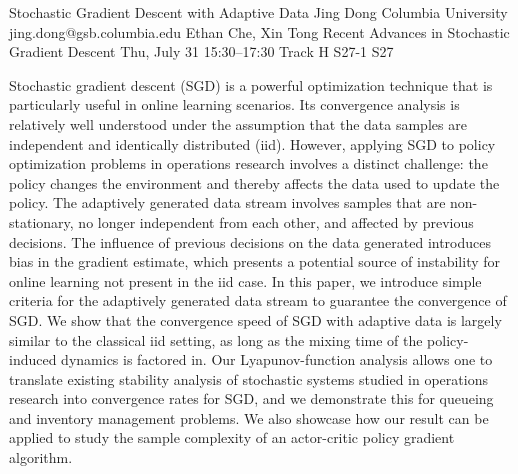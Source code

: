 \begin{talk}
  {Stochastic Gradient Descent with Adaptive Data}%
  {Jing Dong}%
  {Columbia University}%
  {jing.dong@gsb.columbia.edu}%
  {Ethan Che, Xin Tong}%
  {Recent Advances in Stochastic Gradient Descent}%
  {Thu, July 31 15:30–17:30 Track H}%
  {S27-1}%
  {S27}%
				
                
Stochastic gradient descent (SGD) is a powerful optimization technique that is particularly useful in online learning scenarios. Its convergence analysis is relatively well understood under the assumption that the data samples are independent and identically distributed (iid). However, applying SGD to policy optimization
problems in operations research involves a distinct challenge: the policy changes the environment and thereby affects the data used to update the policy. The adaptively generated data stream involves samples that are non-stationary, no longer independent from each other, and affected by previous decisions. The influence of previous decisions on the data generated introduces bias in the gradient estimate, which presents a potential source of instability for online learning not present in the iid case. In this paper, we introduce simple criteria for the adaptively generated data stream to guarantee the convergence of SGD. We show that the convergence
speed of SGD with adaptive data is largely similar to the classical iid setting, as long as the mixing time of the policy-induced dynamics is factored in. Our Lyapunov-function analysis allows one to translate existing stability analysis of stochastic systems studied in operations research into convergence rates for SGD, and
we demonstrate this for queueing and inventory management problems. We also showcase how our result can be applied to study the sample complexity of an actor-critic policy gradient algorithm.			


\medskip


\end{talk}

